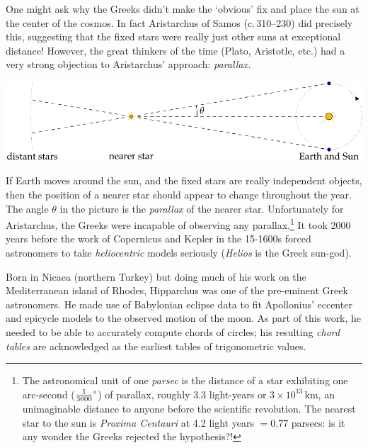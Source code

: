 One might ask why the Greeks didn't make the `obvious' fix and place the sun at the center of the cosmos. In fact Aristarchus of Samos (c.\,310--230\BC) did precisely this, suggesting that the fixed stars were really just other suns at exceptional distance! However, the great thinkers of the time (Plato, Aristotle, etc.) had a very strong objection to Aristarchus' approach: \emph{parallax.}
\begin{center}
	\includegraphics{trig-parallax}
\end{center}
If Earth moves around the sun, and the fixed stars are really independent objects, then the position of a nearer star should appear to change throughout the year. The angle $\theta$ in the picture is the \emph{parallax} of the nearer star. Unfortunately for Aristarchus, the Greeks were incapable of observing any parallax.\footnote{The astronomical unit of one \emph{parsec} is the distance of a star exhibiting one arc-second ($\ang{\frac 1{3600}}$) of parallax, roughly 3.3 light-years or $3\times 10^{13}$\,km, an unimaginable distance to anyone before the scientific revolution. The nearest star to the sun is \emph{Proxima Centauri} at 4.2 light years $=0.77$ parsecs: is it any wonder the Greeks rejected the hypothesis?!}
It took 2000 years before the work of Copernicus and Kepler in the 15-1600s forced astronomers to take \emph{heliocentric} models seriously (\emph{Helios} is the Greek sun-god).
\goodbreak



Born in Nicaea (northern Turkey) but doing much of his work on the Mediterranean island of Rhodes, Hipparchus was one of the pre-eminent Greek astronomers. He made use of Babylonian eclipse data to fit Apollonius' eccenter and epicycle models to the observed motion of the moon. As part of this work, he needed to be able to accurately compute chords of circles; his resulting \emph{chord tables} are acknowledged as the earliest tables of trigonometric values.\par

